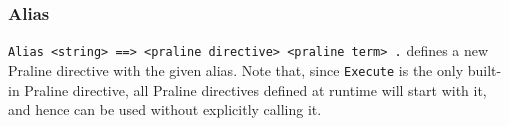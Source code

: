 \documentclass{report}
\begin{document}
\subsubsection{Alias}
\verb+Alias <string> ==> <praline directive> <praline term> .+ defines a new Praline directive with the given alias.
Note that, since \verb+Execute+ is the only built-in Praline directive, all Praline directives defined at runtime will start with it, and hence can be used without explicitly calling it.

\end{document}

